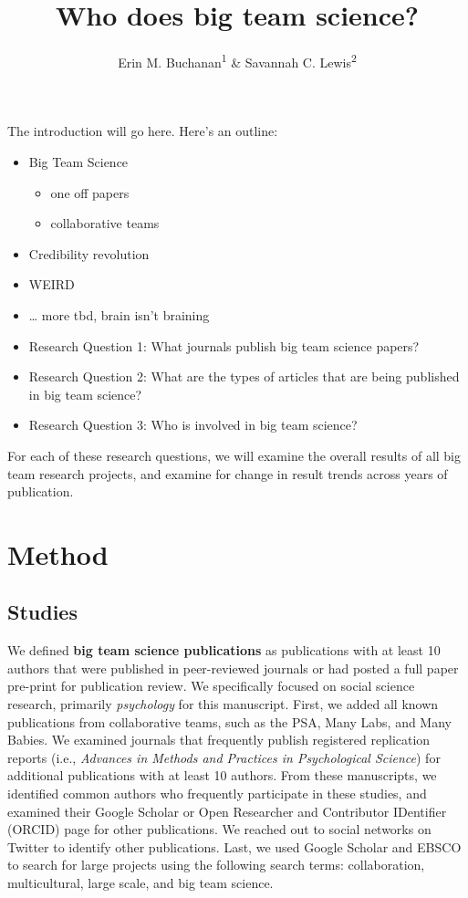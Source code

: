 \documentclass[
  english,
  man]{apa6}
\title{Who does big team science?}
\author{Erin M. Buchanan\textsuperscript{1} \& Savannah C. Lewis\textsuperscript{2}}
\date{}
\affiliation{\vspace{0.5cm}\textsuperscript{1} Harrisburg University of Science and Technology\\\textsuperscript{2} University of Alabama}
\providecommand{\tightlist}{%
  \setlength{\itemsep}{0pt}\setlength{\parskip}{0pt}}
\begin{document}
\maketitle

The introduction will go here. Here's an outline:

\begin{itemize}
\item
  Big Team Science

  \begin{itemize}
  \tightlist
  \item
    one off papers
  \item
    collaborative teams
  \end{itemize}
\item
  Credibility revolution
\item
  WEIRD
\item
  \ldots{} more tbd, brain isn't braining
\item
  Research Question 1: What journals publish big team science papers?
\item
  Research Question 2: What are the types of articles that are being published in big team science?
\item
  Research Question 3: Who is involved in big team science?
\end{itemize}

For each of these research questions, we will examine the overall results of all big team research projects, and examine for change in result trends across years of publication.

\hypertarget{method}{%
\section{Method}\label{method}}

\hypertarget{studies}{%
\subsection{Studies}\label{studies}}

We defined \textbf{big team science publications} as publications with at least 10 authors that were published in peer-reviewed journals or had posted a full paper pre-print for publication review. We specifically focused on social science research, primarily \emph{psychology} for this manuscript. First, we added all known publications from collaborative teams, such as the PSA, Many Labs, and Many Babies. We examined journals that frequently publish registered replication reports (i.e., \emph{Advances in Methods and Practices in Psychological Science}) for additional publications with at least 10 authors. From these manuscripts, we identified common authors who frequently participate in these studies, and examined their Google Scholar or Open Researcher and Contributor IDentifier (ORCID) page for other publications. We reached out to social networks on Twitter to identify other publications. Last, we used Google Scholar and EBSCO to search for large projects using the following search terms: collaboration, multicultural, large scale, and big team science.
\end{document}
